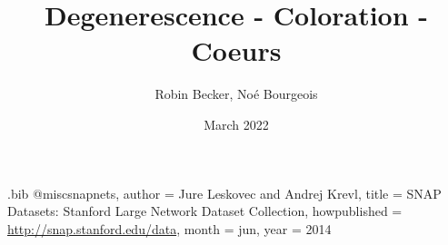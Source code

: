 \RequirePackage{filecontents}

\begin{filecontents}{\jobname.bib}
@misc{snapnets,
author       = {Jure Leskovec and Andrej Krevl},
title        = {{SNAP Datasets}: {Stanford} Large Network Dataset Collection},
howpublished = {\url{http://snap.stanford.edu/data}},
month        = jun,
year         = 2014
}
\end{filecontents}

\documentclass{article}
\usepackage[utf8]{inputenc}
\usepackage[T1]{fontenc}
\usepackage[french]{babel}
\usepackage[parfill]{parskip}
\usepackage{amsmath}
\usepackage{amssymb}
\usepackage{amsfonts}
\usepackage{graphicx}
\usepackage{subfigure}
\usepackage[font={small}]{caption}
\usepackage{float}
\usepackage{listingsutf8}
\usepackage{fullpage}
\usepackage[nochapter]{vhistory}
\usepackage{hyperref}
\usepackage{titlesec}
\usepackage{xcolor}
\usepackage{verbatim}
\usepackage{graphicx}
\usepackage{subcaption}
\usepackage{comment}

\usepackage{natbib}
\usepackage{url}
\usepackage{algpseudocode}

\usepackage{adjustbox}



\newcommand*{\MyIncludeGraphicsMaxSize}[2][]{%
\begin{adjustbox}{max size={\textwidth}{\textheight}}
    \texttt{[image: \#2]}%
\end{adjustbox}
}
\usepackage{array,booktabs,ragged2e}
\newcolumntype{R}[1]{>{\RaggedLeft\arraybackslash}p{#1}}
\newcolumntype{D}[1]{>{\RaggedLeft\arraybackslash}p{#1}}


\hypersetup{
    colorlinks=true,
    linkcolor=blue,
    filecolor=magenta,
    urlcolor=cyan,
    pdfpagemode=FullScreen,
    }


\title{Degenerescence - Coloration - Coeurs}
\author{Robin Becker, Noé Bourgeois }
\date{March 2022}



\maketitle
\tableofcontents
\newpage

\section{Introduction}

